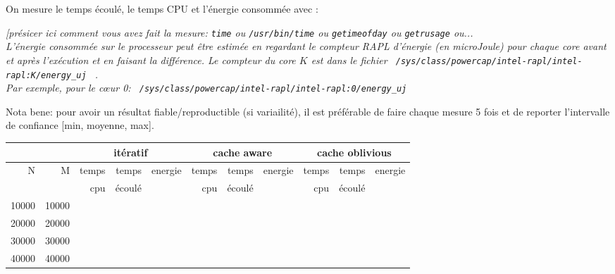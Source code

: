 \documentclass[10pt,a4paper]{article}
\begin{document}
On mesure le temps écoulé, le temps CPU et l'énergie consommée avec : {\em  [présicer ici comment vous avez fait la mesure:
{\tt time} 
ou {\tt /usr/bin/time}
ou {\tt getimeofday}
ou {\tt getrusage}
ou... \\
L'énergie consommée sur le processeur peut être estimée en regardant le compteur RAPL d'énergie (en microJoule)
pour chaque core avant et après l'exécution et en faisant la différence.
Le compteur du core $K$ est dans le fichier 
\verb+ /sys/class/powercap/intel-rapl/intel-rapl:K/energy_uj + .\\
Par exemple, pour le c{\oe}ur 0: 
\verb+ /sys/class/powercap/intel-rapl/intel-rapl:0/energy_uj +

Nota bene: pour avoir un résultat fiable/reproductible (si variailité), 
il est préférable de faire chaque mesure 5 fois et de reporter l'intervalle
de confiance [min, moyenne, max]. 

\begin{tabular}{|r|r||r|r|r||r|r|r||r|r|r||}
\hline
 \multicolumn{2}{|c||}{ } 
& \multicolumn{3}{c||}{itératif}
& \multicolumn{3}{c||}{cache aware}
& \multicolumn{3}{c||}{cache oblivious}
\\ \hline
N & M 
& temps   & temps & energie       %
& temps   & temps & energie       %
& temps   & temps & energie       %
\\
& 
& cpu     & écoulé&               %
& cpu     & écoulé&               %
& cpu     & écoulé&               %
\\ \hline
\hline
10000 & 10000 
&  &  &   %
&  &  &   %
&  &  &   %
\\ \hline
20000 & 20000 
&  &  &   %
&  &  &   %
&  &  &   %
\\ \hline
30000 & 30000 
&  &  &   %
&  &  &   %
&  &  &   %
\\ \hline
40000 & 40000 
&  &  &   %
&  &  &   %
&  &  &   %
\\ \hline
\hline
\end{tabular}
}
\end{document}
